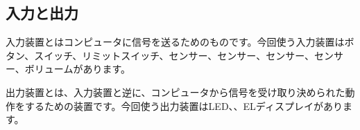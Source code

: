 \subsection{入力と出力}
入力装置とはコンピュータに信号を送るためのものです。今回使う入力装置はボタン、スイッチ、リミットスイッチ、センサー、センサー、センサー、センサー、ボリュームがあります。

出力装置とは、入力装置と逆に、コンピュータから信号を受け取り決められた動作をするための装置です。今回使う出力装置はLED、、ELディスプレイがあります。\\
\begin{tcolorbox}[title=\useOmetoi]
\begin{enumerate}
\end{enumerate}
\end{tcolorbox}













